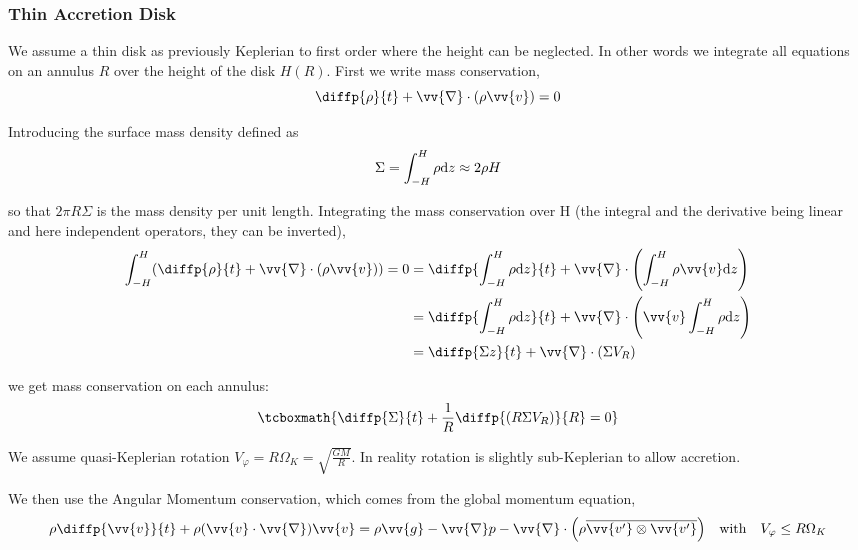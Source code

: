 \documentclass[10pt,a4paper,english]{article}
\let\originalleft\left
\let\originalright\right
\renewcommand{\left}{\mathopen{}\mathclose\bgroup\originalleft}
\renewcommand{\right}{\aftergroup\egroup\originalright}
\begin{document}
\subsubsection{Thin Accretion Disk}


We assume a thin disk as previously Keplerian to first order where the height
can be neglected. In other words we integrate all equations on an annulus $R$
over the height of the disk $H(R)$. First we write mass conservation,
\begin{equation*}
    \diffp{\rho}{t} + \vv{\nabla}\cdot(\rho \vv{v}) = 0
\end{equation*}

Introducing the surface mass density defined as
\begin{equation*}
    \Sigma = \int_{-H}^H \rho \mathrm{d}{z} \approx 2 \rho H
\end{equation*}

so that $2 \pi R \Sigma$ is the mass density per unit length. Integrating the
mass conservation over H (the integral and the derivative being linear and here
independent operators, they can be inverted),
\begin{align*}
    \int_{-H}^H \left( \diffp{\rho}{t} + \vv{\nabla}\cdot(\rho \vv{v}) \right) = 0 %
    &= \diffp{\int_{-H}^H \rho \d{z}}{t} + \vv{\nabla}\cdot\left( \int_{-H}^H \rho \vv{v} \d{z} \right) \\
    &= \diffp{\int_{-H}^H \rho \d{z}}{t} + \vv{\nabla}\cdot\left( \vv{v} \int_{-H}^H \rho \d{z} \right) \\
    &= \diffp{\Sigma z}{t} + \vv{\nabla}\cdot(\Sigma V_R)
\end{align*}

we get mass conservation on each annulus:
\begin{equation}
    \label{eq:alpha_mass}
    \tcboxmath{
        \diffp{\Sigma}{t} + \frac{1}{R} \diffp{(R \Sigma V_R)}{R} = 0
    }
\end{equation}

We assume quasi-Keplerian rotation $V_\varphi = R \Omega_K = \sqrt{\frac{G
M}{R}}$. In reality rotation is slightly sub-Keplerian to allow accretion.

We then use the Angular Momentum conservation, which comes from the global
momentum equation,
\begin{equation*}
    \rho \diffp{\vv{v}}{t} + \rho (\vv{v}\cdot\vv{\nabla})\vv{v} =
    \rho \vv{g} - \vv{\nabla} p - \vv{\nabla}\cdot\left(\rho \overline{\vv{v'} \otimes \vv{v'}}\right) \quad \text{with} \quad V_\varphi \leq R \Omega_K
\end{equation*}
\end{document}
